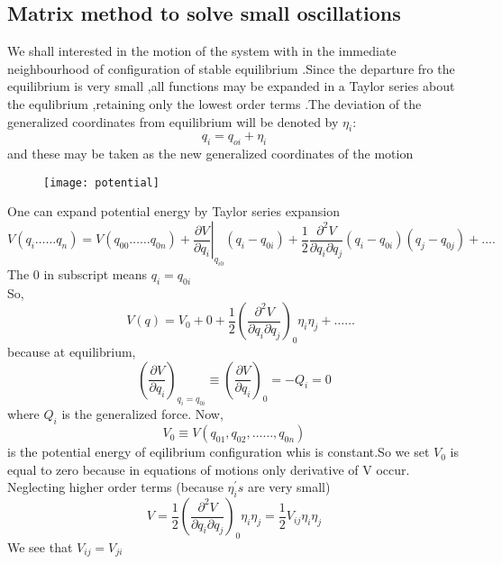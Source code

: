 \subsection{Matrix method to solve small oscillations}
We shall interested in the motion of the system with in the immediate neighbourhood of configuration of stable equilibrium .Since the departure fro the equilibrium is very small ,all functions may be expanded in a Taylor series about the equlibrium ,retaining only the lowest order terms .The deviation of the generalized coordinates from equilibrium will be denoted by $\eta_i$:\\
$$q_i=q_{oi}+\eta_i$$
and these may be taken as the new generalized coordinates of the motion  
\begin{figure}[H]
	\centering
	\texttt{[image: potential]}
	\caption{}
	\label{}
\end{figure}
One can expand potential energy by Taylor series expansion
$$V\left(q_{i} \ldots \ldots q_{n}\right)=V\left(q_{00} \ldots \ldots q_{0 n}\right)+\left.\frac{\partial V}{\partial q_{i}}\right|_{q_{i 0}}\left(q_{i}-q_{0 i}\right)+\frac{1}{2} \frac{\partial^{2} V}{\partial q_{i} \partial q_{j}}\left(q_{i}-q_{0 i}\right)\left(q_{j}-q_{0 j}\right)+\ldots .$$
The 0 in subscript means $q_{i}=q_{0 i}$\\
So,
\begin{equation}
\quad V(q)=V_{0}+0+\frac{1}{2}\left(\frac{\partial^{2} V}{\partial q_{i} \partial q_{j}}\right)_{0} \eta_{i} \eta_{j}+\ldots \ldots \label{ref1}
\end{equation}
because at equilibrium,
$$
\left(\frac{\partial V}{\partial q_{i}}\right)_{q_{i}=q_{0 i}} \equiv\left(\frac{\partial V}{\partial q_{i}}\right)_{0}=-Q_{i}=0
$$
where $Q_{i}$ is the generalized force. Now,
\begin{equation}
V_{0} \equiv V\left(q_{01}, q_{02}, \ldots \ldots, q_{0 n}\right) \label{ref2}
\end{equation}
 is the potential energy of eqilibrium configuration whis is constant.So we set $V_0$ is equal to zero because in equations of motions only derivative of V occur.\\
 Neglecting higher order terms (because $\eta_{i}^{\prime} s$ are very small)
 \begin{equation}
 V=\frac{1}{2}\left(\frac{\partial^{2} V}{\partial q_{i} \partial q_{j}}\right)_{0} \eta_{i} \eta_{j}=\frac{1}{2} V_{i j} \eta_{i} \eta_{j} \label{ref3}
 \end{equation}
 We see that $V_{i j}=V_{j i}$
